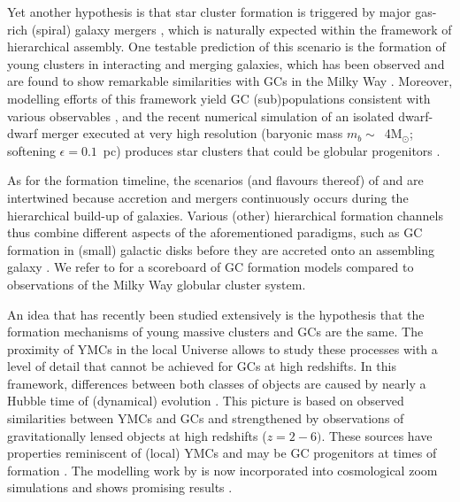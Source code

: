 \documentclass[a4paper,fleqn,usenatbib]{mnras}
\newcommand{\Sun}[0]{\ensuremath{_{\odot}}}
\begin{document}
Yet another hypothesis is that star cluster formation is triggered by major 
gas-rich (spiral) galaxy mergers \citep{1987nngp.proc...18S, 1992ApJ...384...50A},
which is naturally expected within the framework of hierarchical assembly. One
testable prediction of this scenario is the formation of young clusters in
interacting and merging galaxies, which has been observed and are found to show 
remarkable similarities with GCs in the Milky Way \citep[e.g.][]{
1995AJ....109..960W, 1996AJ....112..416H, 1999AJ....118..752Z, 1999AJ....118.1551W}.
Moreover, modelling efforts of this framework yield GC (sub)populations consistent 
with various observables \citep[e.g.][]{2010ApJ...718.1266M, 2018MNRAS.480.2343C}, 
and the recent numerical simulation of an isolated dwarf-dwarf merger executed at 
very high resolution (baryonic mass $m_b \sim$~4M\Sun; softening $\epsilon = 0.1$~pc) 
produces star clusters that could be globular progenitors \citep{
2019arXiv190509840L}.

As for the formation timeline, the scenarios (and flavours thereof) of \citet{
1985ApJ...298...18F} and \citet{1992ApJ...384...50A} are intertwined because
accretion and mergers continuously occurs during the hierarchical build-up of
galaxies. Various (other) hierarchical formation channels thus combine different
aspects of the aforementioned paradigms, such as GC formation in (small) galactic
disks before they are accreted onto an assembling galaxy \citep[e.g.][]{
2000ApJ...533..869C, 2002ApJ...567..853C, 2002MNRAS.333..383B, 2003egcs.conf..224G}. 
We refer to \citet{2001astro.ph..8034G} for a scoreboard of GC formation models 
compared to observations of the Milky Way globular cluster system.

An idea that has recently been studied extensively is the hypothesis that the formation
mechanisms of young massive clusters \citep[YMCs, see][for a review]{2010ARA&A..48..431P} 
and GCs are the same. The proximity of YMCs in the local Universe allows to study these 
processes with a level of detail that cannot be achieved for GCs at high redshifts. In 
this framework, differences between both classes of objects are caused by nearly a 
Hubble time of (dynamical) evolution \citep[e.g.][]{1987degc.book.....S}. This picture 
is based on observed similarities between YMCs and GCs
\citep[e.g.][]{1992AJ....103..691H,1999AJ....118.1551W} and strengthened by observations
of gravitationally lensed objects at high redshifts ($z = 2-6)$. These sources have 
properties reminiscent of (local) YMCs and may be GC progenitors at times of formation 
\citep{2017MNRAS.467.4304V,2017ApJ...843L..21J}. The modelling work by 
\citet{2011MNRAS.414.1339K,2012MNRAS.421.1927K,2015MNRAS.454.1658K} is now 
incorporated into cosmological zoom simulations and shows promising results
\citep{2018MNRAS.475.4309P,2019MNRAS.486.3134K}.
\end{document}
